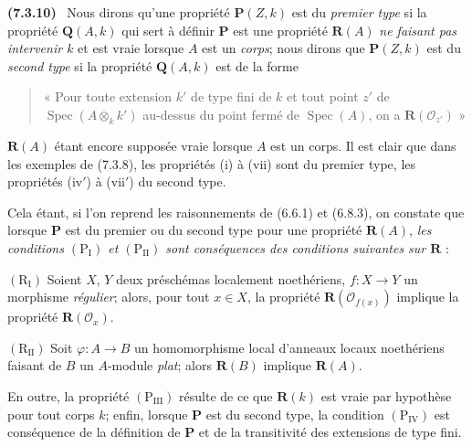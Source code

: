 \documentclass[10pt,oneside]{book}
\newenvironment{env}[1][]{\par\medskip\noindent\textbf{(#1)}\ }{\par}
\begin{document}
\begin{env}[7.3.10]
\label{IV.2.s7.3.10-fr}
Nous dirons qu'une propriété $\boldsymbol P(Z,k)$ est du \emph{premier
type} si la propriété $\boldsymbol Q(A,k)$ qui sert à définir
$\boldsymbol P$ est une propriété $\boldsymbol R(A)$ \emph{ne faisant pas
intervenir $k$} et est vraie lorsque $A$ est un \emph{corps}; nous dirons
que $\boldsymbol P(Z,k)$ est du \emph{second type} si la propriété
$\boldsymbol Q(A,k)$ est de la forme
\begin{quote}
« Pour toute extension $k'$ de type fini de $k$ et tout point $z'$ de
$\operatorname{Spec}(A\otimes_k k')$ au-dessus du point fermé de
$\operatorname{Spec}(A)$, on a $\boldsymbol R(\mathscr O_{z'})$ »
\end{quote}
$\boldsymbol R(A)$ étant encore supposée vraie lorsque $A$ est un corps.
Il est clair que dans les exemples de (7.3.8), les propriétés (i) à (vii)
sont du premier type, les propriétés (iv$'$) à (vii$'$) du second type.

Cela étant, si l'on reprend les raisonnements de (6.6.1) et (6.8.3), on
constate que lorsque $\boldsymbol P$ est du premier ou du second type pour
une propriété $\boldsymbol R(A)$, \emph{les conditions
$(\mathrm P_{\mathrm I})$ et $(\mathrm P_{\mathrm{II}})$ sont
conséquences des conditions suivantes sur $\boldsymbol R$} :

$(\mathrm R_{\mathrm I})$ Soient $X$, $Y$ deux préschémas localement
noethériens, $f:X\to Y$ un morphisme \emph{régulier}; alors, pour tout
$x\in X$, la propriété $\boldsymbol R(\mathscr O_{f(x)})$ implique la
propriété $\boldsymbol R(\mathscr O_x)$.

$(\mathrm R_{\mathrm{II}})$ Soit $\varphi:A\to B$ un homomorphisme local
d'anneaux locaux noethériens faisant de $B$ un $A$-module \emph{plat};
alors $\boldsymbol R(B)$ implique $\boldsymbol R(A)$.

En outre, la propriété $(\mathrm P_{\mathrm{III}})$ résulte de ce que
$\boldsymbol R(k)$ est vraie par hypothèse pour tout corps $k$; enfin,
lorsque $\boldsymbol P$ est du second type, la condition
$(\mathrm P_{\mathrm{IV}})$ est conséquence de la définition de
$\boldsymbol P$ et de la transitivité des extensions de type fini.
\end{env}
\end{document}
